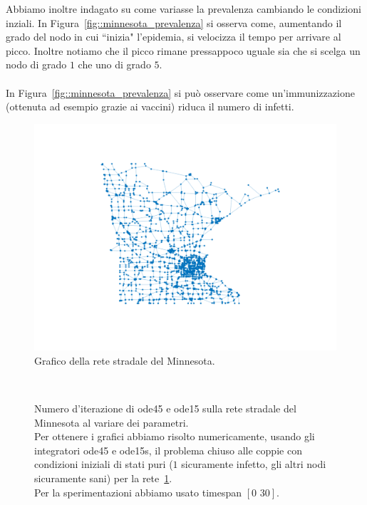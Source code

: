 Abbiamo inoltre indagato su come variasse la prevalenza cambiando le condizioni inziali. In Figura~\ref{fig::minnesota_prevalenza} si osserva come, aumentando il grado del nodo in cui ``inizia" l'epidemia, si velocizza il tempo per arrivare al picco. Inoltre notiamo che il picco rimane pressappoco uguale sia che si scelga un nodo di grado $1$ che uno di grado $5$.\\ \\
In Figura~\ref{fig::minnesota_prevalenza} si pu\`o osservare come un'immunizzazione (ottenuta ad esempio grazie ai vaccini)  riduca il numero di infetti.
\begin{figure}[htb]
\centering
\includegraphics[scale=0.8]{Figure/minnesota}
	\caption{Grafico della rete stradale del Minnesota.}
	\label{fig::minnesota}
\end{figure}
\begin{figure}[ht]
\centering
\subfloat[][$\gamma=0.10$]
{\resizebox{0.45\textwidth}{!}{}}
 \quad 
\subfloat[][$\gamma=0.30$]
{\resizebox{0.45\textwidth}{!}{ }}
\\
\subfloat[][$\gamma=0.50$]
{\resizebox{0.45\textwidth}{!}
{}}
\quad
\subfloat[][$\gamma=0.70$]
{\resizebox{0.45\textwidth}{!}
{}
}
\caption[Numero d'iterazione di ode45 e ode15  sulla rete stradale del Minnesota al variare dei parametri]{Numero d'iterazione di ode45 e ode15  sulla rete stradale del Minnesota al variare dei parametri.\\Per ottenere i grafici abbiamo risolto numericamente,  usando gli integratori ode45 e ode15s,  il problema chiuso alle coppie con condizioni iniziali  di stati puri ($1$ sicuramente infetto, gli altri nodi sicuramente sani) per la rete~\ref{fig::minnesota}.\\
Per la sperimentazioni abbiamo usato timespan $[0 \,\,30]$.}
\label{fig::minnesota_lenght}
\end{figure}
